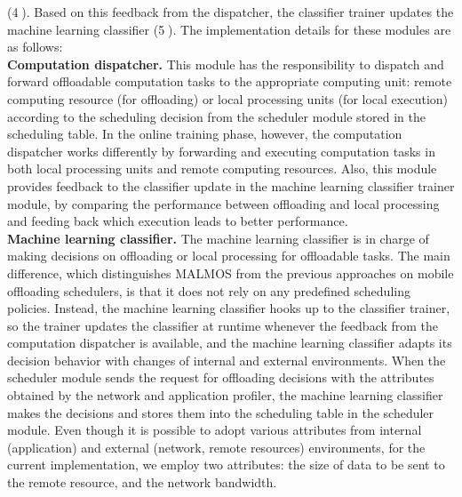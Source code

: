 \documentclass[10pt, conference, compsocconf]{IEEEtran}
\begin{document}
({\textcircled{4}).
%
Based on this feedback from the dispatcher, the classifier trainer updates
the machine learning classifier ({\textcircled{5}).
%
The implementation details for these modules are as follows:\\
%
\indent \textbf{Computation dispatcher.} This module has the
responsibility to dispatch and forward offloadable computation tasks to
the appropriate computing unit: remote computing resource (for offloading) or
local processing units (for local execution) according to the scheduling
decision from the scheduler module stored in the scheduling table.
%
%
In the online training phase, however, the computation dispatcher works
differently by forwarding and executing computation tasks in both local
processing units and remote computing resources.
%
Also, this module provides feedback to the classifier update in the
machine learning classifier trainer module, by comparing the performance
between offloading and local processing and feeding back which execution
leads to better performance.\\
%
\indent \textbf{Machine learning classifier.} The machine learning classifier is
in charge of making decisions on offloading or local processing for
offloadable tasks.
%
The main difference, which distinguishes MALMOS from the previous
approaches on mobile offloading schedulers, is that it does not rely on
any predefined scheduling policies.
%
Instead, the machine learning classifier hooks up to the classifier
trainer, so the trainer updates the classifier at runtime whenever the feedback from
the computation dispatcher is available, and the machine learning
classifier adapts its decision behavior with changes of internal and
external environments.
%
When the scheduler module sends the request for offloading decisions
with the attributes obtained by the network and application profiler,
the machine learning classifier makes the decisions and stores them into
the scheduling table in the scheduler module.
%
Even though it is possible to adopt various attributes
from internal (application) and external (network, remote resources)
environments, for the current implementation, we employ two attributes:
the size of data to be sent to the remote resource, and the network
bandwidth.\\
}}
\end{document}
